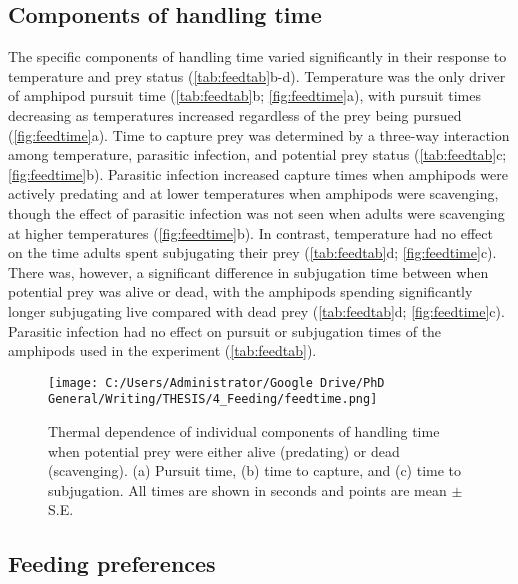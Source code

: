 \subsection{Components of handling time}

The specific components of handling time varied significantly in their response to temperature and prey status (\ref{tab:feedtab}b-d). Temperature was the only driver of amphipod pursuit time (\ref{tab:feedtab}b; \ref{fig:feedtime}a), with pursuit times decreasing as temperatures increased regardless of the prey being pursued (\ref{fig:feedtime}a). Time to capture prey was determined by a three-way interaction among temperature, parasitic infection, and potential prey status (\ref{tab:feedtab}c; \ref{fig:feedtime}b). Parasitic infection increased capture times when amphipods were actively predating and at lower temperatures when amphipods were scavenging, though the effect of parasitic infection was not seen when adults were scavenging at higher temperatures (\ref{fig:feedtime}b). In contrast, temperature had no effect on the time adults spent subjugating their prey (\ref{tab:feedtab}d; \ref{fig:feedtime}c). There was, however, a significant difference in subjugation time between when potential prey was alive or dead, with the amphipods spending significantly longer subjugating live compared with dead prey (\ref{tab:feedtab}d; \ref{fig:feedtime}c). Parasitic infection had no effect on pursuit or subjugation times of the amphipods used in the experiment (\ref{tab:feedtab}).

\begin{figure}%
    \centering
    \texttt{[image: C:/Users/Administrator/Google Drive/PhD General/Writing/THESIS/4\_Feeding/feedtime.png]}
  \caption [Thermal dependence of individual components of handling time when potential prey were either alive (predating) or dead (scavenging)]{Thermal dependence of individual components of handling time when potential prey were either alive (predating) or dead (scavenging). (a) Pursuit time, (b) time to capture, and (c) time to subjugation. All times are shown in seconds and points are mean  $\pm$ S.E.} 
    \label{fig:propeat}
\end{figure}

\subsection{Feeding preferences}

